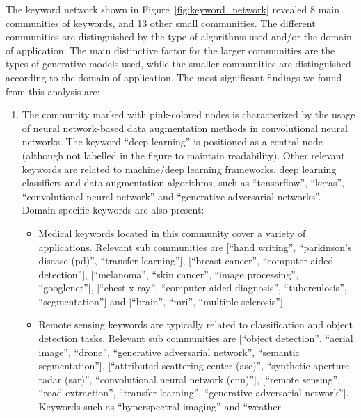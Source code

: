 \documentclass[parskip=full]{scrartcl}
\begin{document}
The keyword network shown in Figure~\ref{fig:keyword_network} revealed 8 main
communities of keywords, and 13 other small communities. The different
communities are distinguished by the type of algorithms used and/or the domain
of application. The main distinctive factor for the larger communities are the
types of generative models used, while the smaller communities are
distinguished according to the domain of application. The most significant
findings we found from this analysis are:

\begin{enumerate}
    \item The community marked with pink-colored nodes is characterized by the
        usage of neural network-based data augmentation methods in
        convolutional neural networks. The keyword ``deep learning'' is
        positioned as a central node (although not labelled in the figure to
        maintain readability). Other relevant keywords are related to
        machine/deep learning frameworks, deep learning classifiers and data
        augmentation algorithms, such as ``tensorflow'', ``keras'',
        ``convolutional neural network'' and ``generative adversarial
        networks''. Domain specific keywords are also present:
        \begin{itemize}
            \item Medical keywords located in this community cover a variety
                of applications. Relevant sub communities are [``hand
                writing'', ``parkinson's disease (pd)'', ``transfer
                learning''], [``breast cancer'', ``computer-aided
                detection''], [``melanoma'', ``skin cancer'', ``image
                processing'', ``googlenet''], [``chest x-ray'',
                ``computer-aided diagnosis'', ``tuberculosis'',
                ``segmentation''] and [``brain'', ``mri'', ``multiple
                sclerosis'']. 
            \item Remote sensing keywords are typically related to
                classification and object detection tasks. Relevant sub
                communities are [``object detection'', ``aerial image'',
                ``drone'', ``generative adversarial network'', ``semantic
                segmentation''], [``attributed scattering center (asc)'',
                ``synthetic aperture radar (sar)'', ``convolutional neural
                network (cnn)''], [``remote sensing'', ``road extraction'',
                ``transfer learning'', ``generative adversarial network''].
                Keywords such as ``hyperspectral imaging'' and ``weather

\end{itemize}
\end{enumerate}
\end{document}

